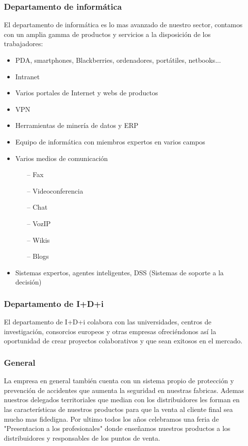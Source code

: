 \documentclass[a4paper]{article}
\begin{document}
\subsubsection{Departamento de informática}
El departamento de informática es lo mas avanzado de nuestro sector, contamos con un amplia gamma de productos y servicios a la disposición de los trabajadores:
\begin{itemize}
	\item PDA, smartphones, Blackberries, ordenadores, portátiles, netbooks...
	\item Intranet
	\item Varios portales de Internet y webs de productos
	\item VPN
	\item Herramientas de minería de datos y ERP
	\item Equipo de informática con miembros expertos en varios campos
	\item Varios medios de comunicación
		\begin{itemize}
			\item[--] Fax
			\item[--] Videoconferencia
			\item[--] Chat
			\item[--] VozIP
			\item[--] Wikis
			\item[--] Blogs
		\end{itemize}
	\item Sistemas expertos, agentes inteligentes, DSS (Sistemas de soporte a la decisión)
	
\end{itemize}
\subsubsection{Departamento de I+D+i}
El departamento de I+D+i colabora con las universidades, centros de investigación, consorcios europeos y otras empresas ofreciéndonos así la oportunidad de crear proyectos colaborativos y que sean exitosos en el mercado.

\subsubsection{General}
La empresa en general también cuenta con un sistema propio de protección y prevención de accidentes que aumenta la seguridad en nuestras fabricas. Ademas nuestros delegados territoriales que median con los distribuidores les forman en las características de nuestros productos para que la venta al cliente final sea mucho mas fidedigna. Por ultimo todos los años celebramos una feria de "Presentacion a los profesionales" donde enseñamos nuestros productos a los distribuidores y responsables de los puntos de venta.
\end{document}
